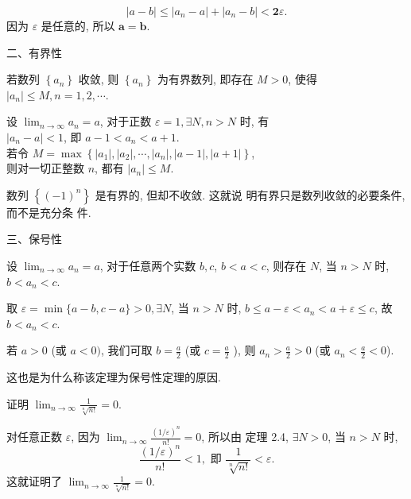 \documentclass [t,12pt,mathserif] {beamer}
\begin{document}
\begin{frame}{}
$$
|a-b| \leq\left|a_n-a\right|+\left|a_n-b\right|<\mathbf{2} \varepsilon .
$$
   因为 $\varepsilon$ 是任意的, 所以 $\boldsymbol{a}=\boldsymbol{b}$.   
\end{frame}

\begin{frame}{二、有界性}%
 \begin{thm}
若数列 $\left\{a_n\right\}$ 收敛, 则 $\left\{a_n\right\}$ 为有界数列, 即存在 $M>0$, 使得 $\left|a_n\right| \leq M, n=1,2, \cdots$.
\end{thm}
\zheng 设 $\lim _{n \rightarrow \infty} a_n=a$, 对于正数 $\varepsilon=1, \exists N, n>N$ 时, 有\\ $\left|a_n-a\right|<1$, 即 $a-1<a_n<a+1$.\\
若令 $M=\max \left\{\left|a_1\right|,\left|a_2\right|, \cdots,\left|a_n\right|,|a-1|,|a+1|\right\}$,\\
则对一切正整数 $n$, 都有 $\left|a_n\right| \leq M$.
\begin{alertblock}{}
 数列 $\left\{(-1)^n\right\}$ 是有界的, 但却不收敛. 这就说 明有界只是数列收敛的必要条件, 而不是充分条 件.
\end{alertblock}
\end{frame}


\begin{frame}{  三、保号性}%
\begin{thm}
设 $\lim _{n \rightarrow \infty} a_n=a$, 对于任意两个实数 $b, c$, $b<a<c$, 则存在 $N$, 当 $n>N$ 时, $b<a_n<c$.
\end{thm}
\zheng 取 $\varepsilon=\min \{a-b, c-a\}>0, \exists N$, 当 $n>N$ 时, $b \leq a-\varepsilon<a_n<a+\varepsilon \leq c$, 故 $b<a_n<c$. 
\begin{alertblock}{}
 若 $a>0$ (或 $a<0)$, 我们可取 $b=\frac{a}{2}$ (或 $c=\frac{a}{2}$ ), 则 $a_n>\frac{a}{2}>0$ (或 $a_n<\frac{a}{2}<0$).
\end{alertblock}
这也是为什么称该定理为保号性定理的原因.  
\end{frame}

\begin{frame}{}%
\begin{ex}
证明 $\lim _{n \rightarrow \infty} \frac{1}{\sqrt[n]{n !}}=0$.
\end{ex}
\zheng 对任意正数 $\varepsilon$, 因为 $\lim _{n \rightarrow \infty} \frac{(1 / \varepsilon)^n}{n !}=0$, 所以由 定理 2.4, $\exists N>0$, 当 $n>N$ 时,
$$
\frac{(1 / \varepsilon)^n}{n !}<1, \text { 即 } \frac{1}{\sqrt[n]{n !}}<\varepsilon . 
$$
这就证明了 $\lim _{n \rightarrow \infty} \frac{1}{\sqrt[n]{n !}}=0$.
\end{frame}
\end{document}
